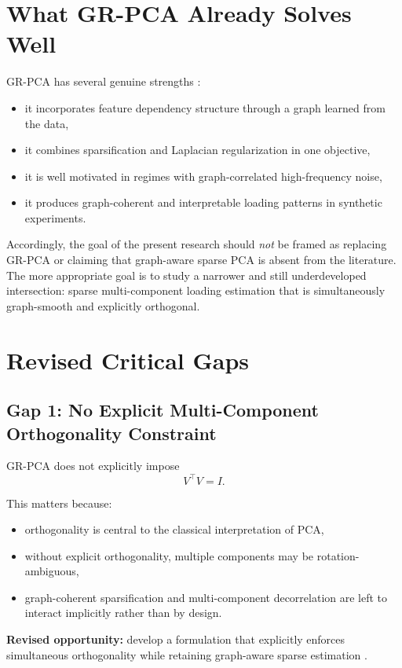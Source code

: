 \documentclass[11pt]{article}
\begin{document}
\section{What GR-PCA Already Solves Well}

GR-PCA has several genuine strengths \cite{briola2026grpca}:
\begin{itemize}
    \item it incorporates feature dependency structure through a graph learned from the data,
    \item it combines sparsification and Laplacian regularization in one objective,
    \item it is well motivated in regimes with graph-correlated high-frequency noise,
    \item it produces graph-coherent and interpretable loading patterns in synthetic experiments.
\end{itemize}

Accordingly, the goal of the present research should \emph{not} be framed as replacing GR-PCA or claiming that graph-aware sparse PCA is absent from the literature. The more appropriate goal is to study a narrower and still underdeveloped intersection: sparse multi-component loading estimation that is simultaneously graph-smooth and explicitly orthogonal.

\section{Revised Critical Gaps}

\subsection{Gap 1: No Explicit Multi-Component Orthogonality Constraint}

GR-PCA does not explicitly impose
\[
V^\top V = I.
\]

This matters because:
\begin{itemize}
    \item orthogonality is central to the classical interpretation of PCA,
    \item without explicit orthogonality, multiple components may be rotation-ambiguous,
    \item graph-coherent sparsification and multi-component decorrelation are left to interact implicitly rather than by design.
\end{itemize}

\textbf{Revised opportunity:} develop a formulation that explicitly enforces simultaneous orthogonality while retaining graph-aware sparse estimation \cite{chen2020amanpg,bertsimas2023geospca,cheng2026orthogonalspca}.
\end{document}
